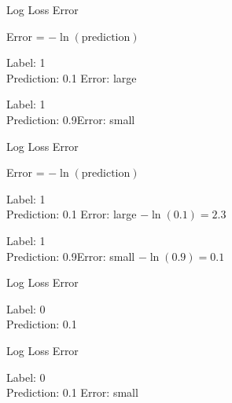 \documentclass{beamer}
\begin{document}
\begin{frame}{Log Loss Error}
    \begin{center}
    \Large Error = $-\ln(\text{prediction})$
\end{center}

\begin{flushleft}
    \Large Label: 1 \\
    \Large Prediction: 0.1 \hfill Error: large 
\end{flushleft}

\begin{flushleft}
    \Large Label: 1\\
    \Large Prediction: 0.9\hfill Error: small
\end{flushleft}
\end{frame}

\begin{frame}{Log Loss Error}
    \begin{center}
    \Large Error = $-\ln(\text{prediction})$
\end{center}

\begin{flushleft}
    \Large Label: 1 \\
    \Large Prediction: 0.1 \hfill Error: large \hfill $-\ln(0.1) = 2.3$
\end{flushleft}

\begin{flushleft}
    \Large Label: 1\\
    \Large Prediction: 0.9\hfill Error: small \hfill $-\ln(0.9) = 0.1$
\end{flushleft}
\end{frame}

\begin{frame}{Log Loss Error}


\begin{flushleft}
    \Large Label: 0 \\
    \Large Prediction: 0.1 
\end{flushleft}

\end{frame}

\begin{frame}{Log Loss Error}
    

\begin{flushleft}
    \Large Label: 0 \\
    \Large Prediction: 0.1 \hfill Error: small 
\end{flushleft}


\end{frame}
\end{document}
